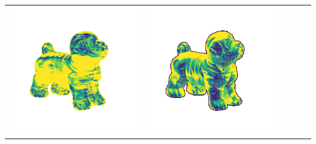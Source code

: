 \begin{tabularx}{\linewidth}{@{}Y@{}Y@{}Y@{}Y@{}Y@{}Y@{}}
\includegraphics[width=\linewidth]{semisynthetic/20150514_17_yu_err.png} &
\includegraphics[width=\linewidth]{semisynthetic/20150514_17_dpsn_err.png} &

\end{tabularx}
